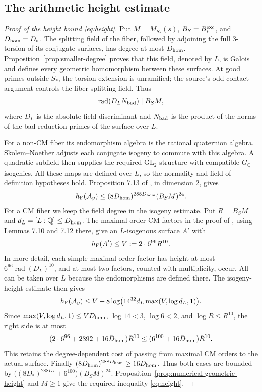 \documentclass[11pt]{article}
\theoremstyle{definition}
\newcommand{\Q}{\mathbb Q}\newcommand{\Z}{\mathbb Z}
\begin{document}
\subsection{The arithmetic height estimate}
\begin{proof}[Proof of the height bound \eqref{eq:height}]
Put \(M=M_{S_*}(s)\), \(B_S=B_*^{\rm exc}\), and \(D_{\rm hom}=D_*\). The splitting field of the fiber, followed by adjoining the full
3-torsion of its conjugate surfaces, has degree at most
\(D_{\rm hom}\). Proposition~\ref{prop:smaller-degree} proves that
this field, denoted by \(L\), is Galois and defines every geometric
homomorphism between these surfaces. At good primes outside \(S_*\), the torsion extension
is unramified; the source's odd-contact argument controls the fiber
splitting field. Thus
\[
 \operatorname{rad}(D_L N_{\rm bad})\mid B_S M,
\]
where \(D_L\) is the absolute field discriminant and
\(N_{\rm bad}\) is the product of the norms of the bad-reduction
primes of the surface over \(L\).

For a non-CM fiber its endomorphism algebra is the rational
quaternion algebra. Skolem--Noether adjusts each conjugate isogeny
to commute with this algebra. A quadratic subfield then supplies
the required \(\mathrm{GL}_2\)-structure with compatible
\(G_\Q\)-isogenies. All these maps are defined over \(L\),
so the normality and field-of-definition hypotheses hold.
Proposition 7.13 of \cite{vonKaenelKret}, in dimension 2, gives
\[
 h_{\rm F}(\mathcal A_y)
       \le(8D_{\rm hom})^{288D_{\rm hom}}(B_SM)^{24}.
\]
For a CM fiber we keep the field degree in the isogeny estimate.
Put \(R=B_SM\) and \(d_L=[L:\Q]\le D_{\rm hom}\).
The maximal-order CM factors in the proof of
\cite[Section 7.3.3]{vonKaenelKret}, using Lemmas 7.10 and 7.12
there, give an \(L\)-isogenous surface \(A'\) with
\[
                       h_{\rm F}(A')\le V:=2\cdot6^{96}R^{10}.
\]
In more detail, each simple maximal-order factor has height at most
\(6^{96}\operatorname{rad}(D_L)^{10}\), and at most two factors,
counted with multiplicity, occur. All can be taken over \(L\)
because the endomorphisms are defined there.
The isogeny-height estimate \cite[(7.13)]{vonKaenelKret} then gives
\[
 h_{\rm F}(\mathcal A_y)
 \le V+8\log\bigl(14^{32}d_L\max(V,\log d_L,1)\bigr).
\]
Since \(\max(V,\log d_L,1)\le V D_{\rm hom}\),
\(\log14<3\), \(\log6<2\), and \(\log R\le R^{10}\),
the right side is at most
\[
 (2\cdot6^{96}+2392+16D_{\rm hom})R^{10}
     \le(6^{100}+16D_{\rm hom})R^{10}.
\]
This retains the degree-dependent cost of passing from maximal CM
orders to the actual surface. Finally
\((8D_{\rm hom})^{288D_{\rm hom}}\ge16D_{\rm hom}\).
Thus both cases are bounded by
\(\bigl((8D_*)^{288D_*}+6^{100}\bigr)(B_SM)^{24}\).
Proposition~\ref{prop:numerical-geometric-height} and \(M\ge1\)
give the required inequality \eqref{eq:height}.
\end{proof}
\end{document}
